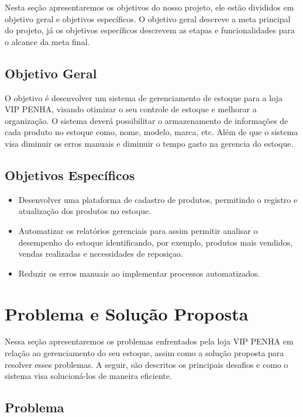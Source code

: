\documentclass[
	12pt,				%
	openany,			%
	twoside,			%
	a4paper,			%
	english,			%
	brazil				%
	]{abntex2}
\begin{document}
Nesta seção apresentaremos os objetivos do nosso projeto, ele estão divididos em objetivo geral e objetivos específicos. O objetivo geral descreve a meta principal do projeto, já os objetivos específicos descrevem as etapas e funcionalidades para o alcance da meta final.

\subsection{Objetivo Geral}

O objetivo é desenvolver um sistema de gerenciamento de estoque para a loja VIP PENHA, visando otimizar o seu controle de estoque e melhorar a organização. O sistema deverá possibilitar o armazenamento de informações de cada produto no estoque como, nome, modelo, marca, etc. Além de que o sistema visa diminuir os erros manuais e diminuir o tempo gasto na gerencia do estoque.

\subsection{Objetivos Específicos}

\begin{itemize}
    \item Desenvolver uma plataforma de cadastro de produtos, permitindo o registro e atualização dos produtos no estoque.
    \item Automatizar os relatórios gerenciais para assim permitir analisar o desempenho do estoque identificando, por exemplo, produtos mais vendidos, vendas realizadas e necessidades de reposiçao.
    \item Reduzir os erros manuais ao implementar processos automatizados.
\end{itemize}

\section{Problema e Solução Proposta}

Nessa seção apresentaremos os problemas enfrentados pela loja VIP PENHA em relação ao gerenciamento do seu estoque, assim como a solução proposta para resolver esses problemas. A seguir, são descritos os principais desafios e como o sistema visa solucioná-los de maneira eficiente.

\subsection{Problema}
\end{document}
